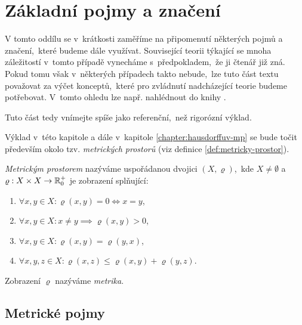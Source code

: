 \section{Základní pojmy a značení}\label{sec:zakladni-pojmy-a-znaceni}

V tomto oddílu se v~krátkosti zaměříme na připomenutí některých pojmů a značení,~které budeme dále využívat. Související teorii týkající se mnoha záležitostí v~tomto případě vynecháme s~předpokladem,~že ji čtenář již zná. Pokud tomu však v~některých případech takto nebude,~lze tuto část textu považovat za výčet konceptů,~které pro zvládnutí nadcházející teorie budeme potřebovat. V~tomto ohledu lze např. nahlédnout do knihy \cite{NetukaAnalyza2014}.

Tuto část tedy vnímejte spíše jako referenční,~než rigorózní výklad.

Výklad v~této kapitole a dále v~kapitole \ref{chapter:hausdorffuv-mp} se bude točit především okolo tzv. \emph{metrických prostorů} (viz definice \ref{def:metricky-prostor}).
\begin{definition}\label{def:metricky-prostor}
    \emph{Metrickým prostorem} nazýváme uspořádanou dvojici $(X,\varrho)$,~kde $X\neq\emptyset$ a $\varrho:X\times X \rightarrow \mathbb{R}_0^+$ je zobrazení splňující:
    \begin{enumerate}[label=(\alph*)]
        \item $\forall x,y\in X: \varrho(x,y)=0\iff x=y$,
        \item $\forall x,y\in X: x\neq y\implies \varrho(x,y)>0$,
        \item $\forall x,y\in X: \varrho(x,y)=\varrho(y,x)$,
        \item $\forall x,y,z\in X: \varrho(x,z)\leqslant\varrho(x,y)+\varrho(y,z)$.
    \end{enumerate}
    Zobrazení $\varrho$ nazýváme \emph{metrika}.
\end{definition}

\subsection{Metrické pojmy}\label{subsec:metricke-pojmy}

